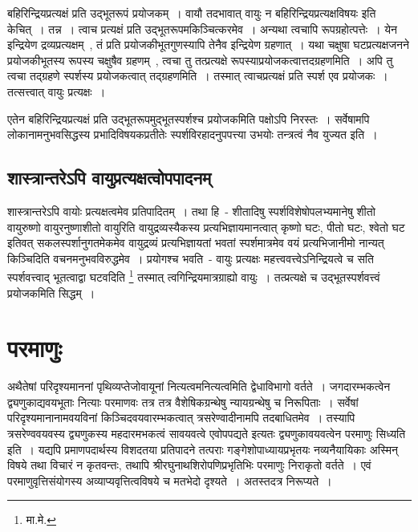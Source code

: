 		बहिरिन्द्रियप्रत्यक्षं प्रति उद्भूतरूपं प्रयोजकम्~। वायौ तदभावात् वायुः‌ न बहिरिन्द्रियप्रत्यक्षविषयः‌ इति केचित्~। तन्न~। त्वाच प्रत्यक्षं प्रति उद्भूतरूपमकिञ्चित्करमेव~। अन्यथा त्वचापि रूपग्रहोत्पत्तेः~। येन इन्द्रियेण द्रव्यप्रत्यक्षम्~, तं प्रति प्रयोजकीभूतगुणस्यापि तेनैव इन्द्रियेण ग्रहणात्~। यथा चक्षुषा घटप्रत्यक्षजनने प्रयोजकीभूतस्य रूपस्य चक्षुषैव ग्रहणम्~, त्वचा तु तत्प्रत्यक्षे रूपस्याप्रयोजकत्वात्तदग्रहणमिति~। अपि तु त्वचा तद्ग्रहणे स्पर्शस्य प्रयोजकत्वात् तद्ग्रहणमिति~। तस्मात् त्वाचप्रत्यक्षं प्रति स्पर्श एव प्रयोजकः~। तत्सत्त्वात् वायुः प्रत्यक्षः‌~।

		एतेन बहिरिन्द्रियप्रत्यक्षं प्रति उद्भूतरूपमुद्भूतस्पर्शश्च प्रयोजकमिति पक्षोऽपि निरस्तः~। सर्वेषामपि लोकानामनुभवसिद्धस्य प्रभादिविषयकप्रतीतेः स्पर्शविरहादनुपपत्त्या उभयोः तन्त्रत्वं नैव युज्यत इति~।

		\subsection{शास्त्रान्तरेऽपि वायुप्रत्यक्षत्वोपपादनम्}

		शास्त्रान्तरेऽपि वायोः प्रत्यक्षत्वमेव प्रतिपादितम्~। तथा हि~- {\fontsize{11.7}{0}\selectfont\s शीतादिषु स्पर्शविशेषोपलभ्यमानेषु शीतो वायुरुष्णो वायुरनुष्णाशीतो वायुरिति वायुद्रव्यस्यैकस्य प्रत्यभिज्ञायमानत्वात् कृष्णो घटः, पीतो घटः, श्वेतो घट इतिवत् सकलस्पर्शानुगतमेकमेव वायुद्रव्यं प्रत्यभिज्ञायतां भवतां स्पर्शमात्रमेव वयं प्रत्यभिजानीमो नान्यत् किञ्चिदिति वचनमनुभवविरुद्धमेव~। प्रयोगश्च भवति~- वायुः प्रत्यक्षः महत्त्ववत्त्वेऽनिन्द्रियत्वे च सति स्पर्शवत्त्वाद् भूतत्वाद्वा घटवदिति \footnote{मा.मे.}} तस्मात् त्वगिन्द्रियमात्रग्राह्यो वायुः~। तत्प्रत्यक्षे च उद्भूतस्पर्शवत्त्वं प्रयोजकमिति सिद्धम्~।



	\section{परमाणुः}

	अथैतेषां परिदृश्यमाननां पृथिव्यप्तेजोवायूनां नित्यत्वमनित्यत्वमिति द्वेधाविभागो वर्तते~। जगदारम्भकत्वेन द्व्यणुकाद्यवयभूताः नित्याः परमाणवः तत्र तत्र वैशेषिकग्रन्थेषु न्यायग्रन्थेषु च निरूपिताः~। सर्वेषां परिदृश्यमानानामवयविनां किञ्चिदवयवारम्भकत्वात् त्रसरेण्वादीनामपि तदबाधितमेव~। तस्यापि त्रसरेण्ववयवस्य द्व्यणुकस्य महदारमभकत्वं सावयवत्वे एवोपपद्यते इत्यतः द्व्यणुकावयवत्वेन परमाणुः सिध्यति इति~। यद्यपि प्रमाणपदार्थस्य विशदतया प्रतिपादने तत्पराः गङ्गेशोपाध्यायप्रभृतयः नव्यनैयायिकाः अस्मिन् विषये तथा विचारं न कृतवन्तः, तथापि श्रीरघुनाथशिरोपणिप्रभृतिभिः परमाणुः निराकृतो वर्तते~। एवं परमाणुवृत्तिसंयोगस्य अव्याप्यवृत्तित्वविषये च मतभेदो दृश्यते~। अतस्तदत्र निरूप्यते~।

